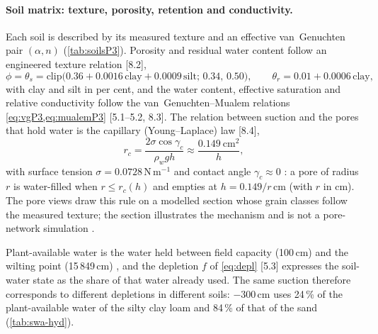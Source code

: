 \documentclass[preprint,12pt]{elsarticle}
\begin{document}
\paragraph{Soil matrix: texture, porosity, retention and conductivity.}
\label{sec:sys-soil}
Each soil is described by its measured texture and an effective van~Genuchten pair $(\alpha,n)$ (\cref{tab:soilsP3}). Porosity and residual water content follow an engineered texture relation [8.2],
\begin{equation}
\phi=\theta_s=\mathrm{clip}\bigl(0.36+0.0016\,\mathrm{clay}+0.0009\,\mathrm{silt};\,0.34,\,0.50\bigr),\qquad \theta_r=0.01+0.0006\,\mathrm{clay},
\label{eq:poros}
\end{equation}
with clay and silt in per cent, and the water content, effective saturation and relative conductivity follow the van~Genuchten--Mualem relations \cref{eq:vgP3,eq:mualemP3} \cite{vanGenuchten1980,Mualem1976} [5.1--5.2, 8.3]. The relation between suction and the pores that hold water is the capillary (Young--Laplace) law [8.4],
\begin{equation}
r_c=\frac{2\sigma\cos\gamma_c}{\rho_wgh}\approx\frac{0.149\ \mathrm{cm^2}}{h},
\label{eq:jurin}
\end{equation}
with surface tension $\sigma=0.0728$\,N\,m$^{-1}$ and contact angle $\gamma_c\approx0$ \cite{Hillel1998}: a pore of radius $r$ is water-filled when $r\le r_c(h)$ and empties at $h=0.149/r$\,cm (with $r$ in cm). The pore views draw this rule on a modelled section whose grain classes follow the measured texture; the section illustrates the mechanism and is not a pore-network simulation \cite{Blunt2017}.

Plant-available water is the water held between field capacity (100\,cm) and the wilting point (15\,849\,cm) \cite{Allen1998}, and the depletion $f$ of \cref{eq:depl} [5.3] expresses the soil-water state as the share of that water already used. The same suction therefore corresponds to different depletions in different soils: $-300$\,cm uses 24\,\% of the plant-available water of the silty clay loam and 84\,\% of that of the sand (\cref{tab:swa-hyd}).
\end{document}
